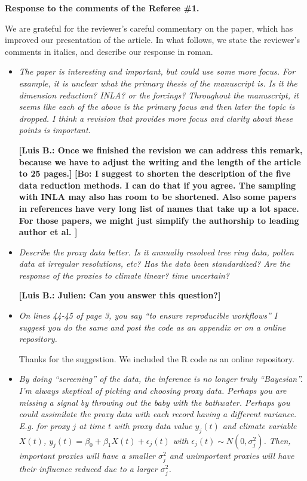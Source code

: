 \documentclass[11pt]{article}
\newcommand{\lb}[1]{\color{ForestGreen}\textbf{[Luis B.: #1]}\normalcolor}
\newcommand{\bl}[1]{\color{red}\textbf{[Bo: #1]}\normalcolor}
\begin{document}
\begin{center}
  {\Large \textbf{Response to the comments of the Referee \#1.}}
\end{center}

We are grateful for the reviewer's careful commentary on the paper, which has improved
our presentation of the article. In what follows, we state the reviewer's
comments in italics, and describe our response in roman.

\begin{itemize}
\item \textit{The paper is interesting and important, but could use some more
focus. For example, it is unclear what the primary thesis of the manuscript is.
Is it the dimension reduction? INLA? or the forcings? Throughout the manuscript,
it seems like each of the above is the primary focus and then later the topic is
dropped. I think a revision that provides more focus and clarity about these
points is important.
}

  \lb{Once we finished the revision we can address this remark, because we have
    to adjust the writing and the length of the article to 25 pages.}
  \bl{I suggest to shorten the description of the five data reduction methods. I can do that if you agree. The sampling with INLA may also has room to be shortened. Also some papers in references have very long list of names that take up a lot space. For those papers, we might just simplify the authorship to leading author et al. }
  
\item \textit{Describe the proxy data better. Is it annually resolved tree ring
    data, pollen data at irregular resolutions, etc? Has the data been
    standardized? Are the response of the proxies to climate linear? time
    uncertain?}

  \lb{Julien: Can you answer this question?}

  
\item \textit{On lines 44-45 of page 3, you say “to ensure reproducible
    workflows” I suggest you do the same and post the code as an appendix or on
    a online repository.}

  Thanks for the suggestion. We included the R code as an online repository.

  
\item \textit{By doing “screening” of the data, the inference is no longer truly
    “Bayesian”. I'm always skeptical of picking and choosing proxy data. Perhaps
    you are missing a signal by throwing out the baby with the bathwater.
    Perhaps you could assimilate the proxy data with each record having a
    different variance. E.g. for proxy $j$ at time $t$ with proxy data value $y_j(t)$ and climate variable $X(t)$, $y_j(t)=\beta_0+\beta_1X(t)+\epsilon_j(t)$
with $\epsilon_j(t)\sim N(0,\sigma_j^2)$. Then, important proxies will have a
smaller $\sigma_j^2$ and unimportant proxies will have their influence reduced due to a larger $\sigma_j^2$.
}


\end{itemize}
\end{document}
